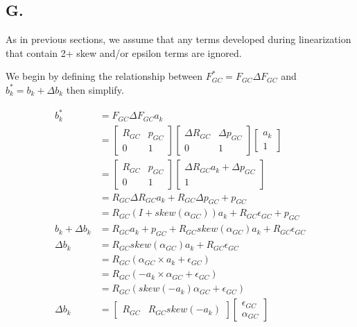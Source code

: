 \documentclass[letterpaper, 11pt]{article}
\begin{document}
\subsection*{G.}
As in previous sections, we assume that any terms developed during linearization that contain 2+ skew and/or epsilon terms are ignored.

We begin by defining the relationship between $F_{GC}^* = F_{GC}\Delta F_{GC}$ and $b_k^* = b_k + \Delta  b_k$ then simplify.

\begin{align}
	b_k^* &= F_{GC}\Delta F_{GC}a_{k} \\
    &= \begin{bmatrix}
    	R_{GC} & p_{GC} \\
        0 & 1
    \end{bmatrix}
    \begin{bmatrix}
    	\Delta R_{GC} & \Delta p_{GC} \\
        0 & 1 
    \end{bmatrix}
    \begin{bmatrix}
    a_k \\
    1
    \end{bmatrix} \\ 
    &= \begin{bmatrix}
    	R_{GC} & p_{GC} \\
        0 & 1
    \end{bmatrix}
    \begin{bmatrix}
    	\Delta R_{GC}a_k + \Delta p_{GC} \\
        1 
    \end{bmatrix} \\
    &= R_{GC}\Delta R_{GC}a_k + R_{GC}\Delta p_{GC} + p_{GC} \\
    &= R_{GC}(I + skew(\alpha_{GC}))a_k + R_{GC}\epsilon_{GC} + p_{GC} \\ 
    b_k + \Delta b_k &= R_{GC}a_k + p_{GC} + R_{GC}skew(\alpha_{GC})a_k + R_{GC}\epsilon_{GC} \\
    \Delta b_k &= R_{GC}skew(\alpha_{GC})a_k + R_{GC}\epsilon_{GC} \\
    &= R_{GC}(\alpha_{GC} \times a_k + \epsilon_{GC}) \\
    &= R_{GC}(-a_k \times \alpha_{GC} + \epsilon_{GC}) \\
    &= R_{GC}(skew(-a_k)\alpha_{GC} + \epsilon_{GC}) \\ 
     \Delta b_k &= \begin{bmatrix}
    	R_{GC} & R_{GC}skew(-a_k)
    \end{bmatrix} 
    \begin{bmatrix}
    	\epsilon_{GC} \\
        \alpha_{GC}
     \end{bmatrix} \\
\end{align}
\end{document}
